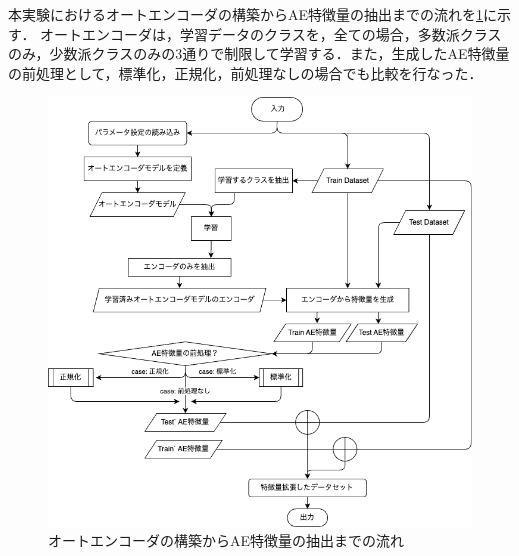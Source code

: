 本実験におけるオートエンコーダの構築からAE特徴量の抽出までの流れを\ref{fig:ae}に示す．
オートエンコーダは，学習データのクラスを，全ての場合，多数派クラスのみ，少数派クラスのみの3通りで制限して学習する．また，生成したAE特徴量の前処理として，標準化，正規化，前処理なしの場合でも比較を行なった．

\begin{figure}[htbp]
    \centering
    \includegraphics[width=15cm]{figures/autoencoder.png}
    \caption{オートエンコーダの構築からAE特徴量の抽出までの流れ}
    \label{fig:ae}
\end{figure}